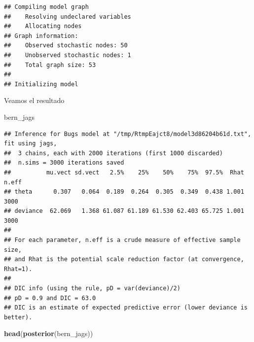 \documentclass[
  12pt,
]{book}
\newenvironment{Shaded}{\begin{snugshade}}{\end{snugshade}}
\newcommand{\DataTypeTok}[1]{\textcolor[rgb]{0.13,0.29,0.53}{#1}}
\newcommand{\KeywordTok}[1]{\textcolor[rgb]{0.13,0.29,0.53}{\textbf{#1}}}
\newcommand{\NormalTok}[1]{#1}
\newcommand{\OperatorTok}[1]{\textcolor[rgb]{0.81,0.36,0.00}{\textbf{#1}}}
\newcommand{\StringTok}[1]{\textcolor[rgb]{0.31,0.60,0.02}{#1}}
\theoremstyle{definition}
\theoremstyle{definition}
\theoremstyle{definition}
\theoremstyle{remark}
\begin{document}
\begin{Shaded}
\end{Shaded}

\begin{verbatim}
## Compiling model graph
##    Resolving undeclared variables
##    Allocating nodes
## Graph information:
##    Observed stochastic nodes: 50
##    Unobserved stochastic nodes: 1
##    Total graph size: 53
## 
## Initializing model
\end{verbatim}

Veamos el resultado

\begin{Shaded}
\begin{Highlighting}[]
\NormalTok{bern_jags}
\end{Highlighting}
\end{Shaded}

\begin{verbatim}
## Inference for Bugs model at "/tmp/RtmpEajct8/model3d86204b61d.txt", fit using jags,
##  3 chains, each with 2000 iterations (first 1000 discarded)
##  n.sims = 3000 iterations saved
##          mu.vect sd.vect   2.5%    25%    50%    75%  97.5%  Rhat n.eff
## theta      0.307   0.064  0.189  0.264  0.305  0.349  0.438 1.001  3000
## deviance  62.069   1.368 61.087 61.189 61.530 62.403 65.725 1.001  3000
## 
## For each parameter, n.eff is a crude measure of effective sample size,
## and Rhat is the potential scale reduction factor (at convergence, Rhat=1).
## 
## DIC info (using the rule, pD = var(deviance)/2)
## pD = 0.9 and DIC = 63.0
## DIC is an estimate of expected predictive error (lower deviance is better).
\end{verbatim}

\begin{Shaded}
\begin{Highlighting}[]
\KeywordTok{head}\NormalTok{(}\KeywordTok{posterior}\NormalTok{(bern_jags))}
\end{Highlighting}
\end{Shaded}
\end{document}
